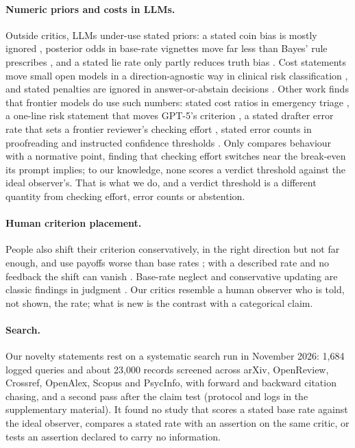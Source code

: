 \documentclass[letterpaper]{article} %
\begin{document}
\paragraph{Numeric priors and costs in LLMs.} Outside critics, LLMs under-use stated priors: a stated coin bias is mostly ignored \citep{gupta2025coin}, posterior odds in base-rate vignettes move far less than Bayes' rule prescribes \citep{li2024dual}, and a stated lie rate only partly reduces truth bias \citep{markowitz2023truth}. Cost statements move small open models in a direction-agnostic way in clinical risk classification \citep{liu2026clinical}, and stated penalties are ignored in answer-or-abstain decisions \citep{wang2026faithful,mohamadi2025honesty}. Other work finds that frontier models do use such numbers: stated cost ratios in emergency triage \citep{yamin2026triage}, a one-line risk statement that moves GPT-5's criterion \citep{servajean2026metacognition}, a stated drafter error rate that sets a frontier reviewer's checking effort \citep{lijo2026bandages}, stated error counts in proofreading \citep{yang2026framing} and instructed confidence thresholds \citep{kumaran2026causal}. Only \citet{lijo2026bandages} compares behaviour with a normative point, finding that checking effort switches near the break-even its prompt implies; to our knowledge, none scores a verdict threshold against the ideal observer's. That is what we do, and a verdict threshold is a different quantity from checking effort, error counts or abstention.

\paragraph{Human criterion placement.} People also shift their criterion conservatively, in the right direction but not far enough, and use payoffs worse than base rates \citep{ulehla1966optimality,healy1981probability,bohil2001category,maddox2002toward,rahnev2018suboptimality}; with a described rate and no feedback the shift can vanish \citep{estes1995interactions}. Base-rate neglect and conservative updating are classic findings in judgment \citep{kahneman1973psychology,edwards1982conservatism}. Our critics resemble a human observer who is told, not shown, the rate; what is new is the contrast with a categorical claim.

\paragraph{Search.} Our novelty statements rest on a systematic search run in November 2026: 1,684 logged queries and about 23,000 records screened across arXiv, OpenReview, Crossref, OpenAlex, Scopus and PsycInfo, with forward and backward citation chasing, and a second pass after the claim test (protocol and logs in the supplementary material). It found no study that scores a stated base rate against the ideal observer, compares a stated rate with an assertion on the same critic, or tests an assertion declared to carry no information.
\end{document}
